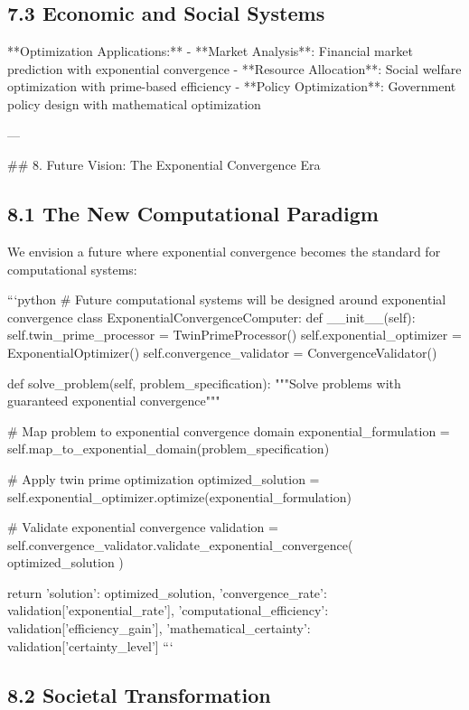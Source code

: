 \documentclass[12pt,a4paper]{article}
\begin{document}
\subsection{7.3 Economic and Social Systems}

**Optimization Applications:**
- **Market Analysis**: Financial market prediction with exponential convergence
- **Resource Allocation**: Social welfare optimization with prime-based efficiency
- **Policy Optimization**: Government policy design with mathematical optimization

---

## 8. Future Vision: The Exponential Convergence Era

\subsection{8.1 The New Computational Paradigm}

We envision a future where exponential convergence becomes the standard for computational systems:

```python
# Future computational systems will be designed around exponential convergence
class ExponentialConvergenceComputer:
    def __init__(self):
        self.twin_prime_processor = TwinPrimeProcessor()
        self.exponential_optimizer = ExponentialOptimizer()
        self.convergence_validator = ConvergenceValidator()
        
    def solve_problem(self, problem_specification):
        """Solve problems with guaranteed exponential convergence"""
        
        # Map problem to exponential convergence domain
        exponential_formulation = self.map_to_exponential_domain(problem_specification)
        
        # Apply twin prime optimization
        optimized_solution = self.exponential_optimizer.optimize(exponential_formulation)
        
        # Validate exponential convergence
        validation = self.convergence_validator.validate_exponential_convergence(
            optimized_solution
        )
        
        return {
            'solution': optimized_solution,
            'convergence_rate': validation['exponential_rate'],
            'computational_efficiency': validation['efficiency_gain'],
            'mathematical_certainty': validation['certainty_level']
        }
```

\subsection{8.2 Societal Transformation}
\end{document}
